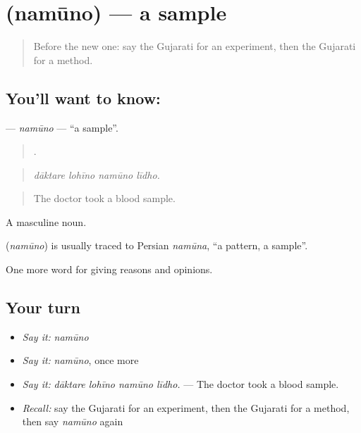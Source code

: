 \section[\texorpdfstring{\gu{નમૂનો} (namūno)}{નમૂનો (namūno)}]{ (namūno) — a sample}

\label{lesson:GU-C362-namuno}



\begin{quote}
Before the new one: say the Gujarati for an experiment, then the Gujarati for a method.
\end{quote}

\subsection*{You'll want to know: }
\textbf{} — \emph{namūno} — \textquotedblleft{}a sample\textquotedblright{}.

\begin{quote}
   .
\end{quote}

\begin{quote}
\emph{dāktare lohīno namūno līdho.}
\end{quote}

\begin{quote}
The doctor took a blood sample.
\end{quote}

A masculine noun.

\begin{cousinweb}
\textbf{} (\emph{namūno}) is usually traced to Persian \emph{namūna}, \textquotedblleft{}a pattern, a sample\textquotedblright{}.
\end{cousinweb}

\begin{grammarlens}[title={What you've built}]
One more word for giving reasons and opinions.
\end{grammarlens}

\subsection*{Your turn}
\begin{itemize}
\raggedright
  \item \emph{Say it:} \emph{namūno}
  \item \emph{Say it:} \emph{namūno}, once more
  \item \emph{Say it:} \emph{dāktare lohīno namūno līdho.} — The doctor took a blood sample.
  \item \emph{Recall:} say the Gujarati for an experiment, then the Gujarati for a method, then say \emph{namūno} again
\end{itemize}

